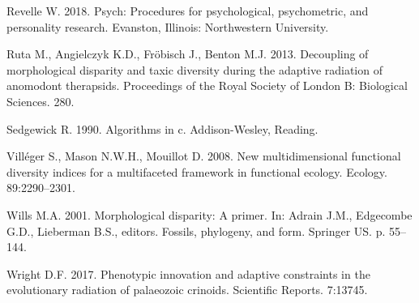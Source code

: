 \documentclass[]{article}
\begin{document}
\hypertarget{ref-psych}{}
Revelle W. 2018. Psych: Procedures for psychological, psychometric, and
personality research. Evanston, Illinois: Northwestern University.

\hypertarget{ref-ruta2013}{}
Ruta M., Angielczyk K.D., Fröbisch J., Benton M.J. 2013. Decoupling of
morphological disparity and taxic diversity during the adaptive
radiation of anomodont therapsids. Proceedings of the Royal Society of
London B: Biological Sciences. 280.

\hypertarget{ref-sedgewick1990}{}
Sedgewick R. 1990. Algorithms in c. Addison-Wesley, Reading.

\hypertarget{ref-villuxe9ger2008}{}
Villéger S., Mason N.W.H., Mouillot D. 2008. New multidimensional
functional diversity indices for a multifaceted framework in functional
ecology. Ecology. 89:2290--2301.

\hypertarget{ref-wills2001}{}
Wills M.A. 2001. Morphological disparity: A primer. In: Adrain J.M.,
Edgecombe G.D., Lieberman B.S., editors. Fossils, phylogeny, and form.
Springer US. p. 55--144.

\hypertarget{ref-wright2017}{}
Wright D.F. 2017. Phenotypic innovation and adaptive constraints in the
evolutionary radiation of palaeozoic crinoids. Scientific Reports.
7:13745.
\end{document}
